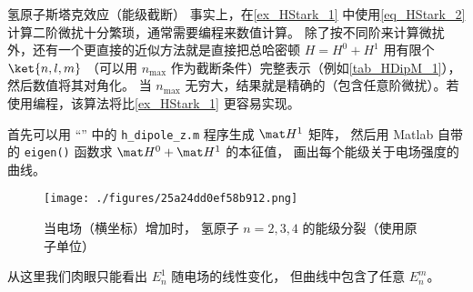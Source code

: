 \begin{example}{氢原子斯塔克效应（能级截断）}\label{ex_HStark_2}
事实上，在\autoref{ex_HStark_1} 中使用\autoref{eq_HStark_2} 计算二阶微扰十分繁琐，通常需要编程来数值计算。 除了按不同阶来计算微扰外，还有一个更直接的近似方法就是直接把总哈密顿 $H = H^0+H^1$ 用有限个 $\ket{n,l,m}$ （可以用 $n_\text{max}$ 作为截断条件）完整表示（例如\autoref{tab_HDipM_1}），然后数值将其对角化。 当 $n_\text{max}$ 无穷大，结果就是精确的（包含任意阶微扰）。若使用编程，该算法将比\autoref{ex_HStark_1} 更容易实现。

首先可以用 “” 中的 \verb`h_dipole_z.m` 程序生成 $\mat H^1$ 矩阵， 然后用 Matlab 自带的 \verb`eigen()` 函数求 $\mat H^0+\mat H^1$ 的本征值， 画出每个能级关于电场强度的曲线。
\begin{figure}[ht]
\centering
\texttt{[image: ./figures/25a24dd0ef58b912.png]}
\caption{当电场（横坐标）增加时， 氢原子 $n=2,3,4$ 的能级分裂（使用原子单位）} \label{fig_HStark_2}
\end{figure}
从这里我们肉眼只能看出 $E_n^1$ 随电场的线性变化， 但曲线中包含了任意 $E_n^m$。
\end{example}


